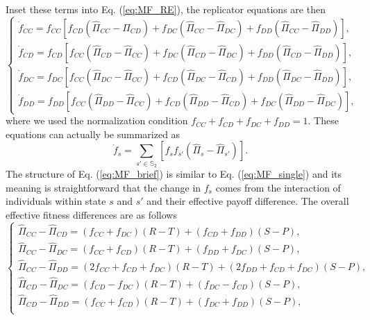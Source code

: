 \documentclass[showpacs,superscriptaddress,reprint,nofootinbib,amsmath,amssymb,aps,pre]{revtex4-1}
\begin{document}
\begin{widetext}
Inset these terms into Eq. (\ref{eq:MF_RE}), the replicator equations are then 
\begin{equation}
     \left\{
                \begin{array}{ll}
                \dot{{f}}_{CC}=f_{CC}[f_{CD}(\widehat{\Pi}_{CC}-\widehat{\Pi}_{CD}) + f_{DC}(\widehat{\Pi}_{CC}-\widehat{\Pi}_{DC}) + f_{DD}(\widehat{\Pi}_{CC}-\widehat{\Pi}_{DD})], \\ 
		\dot{{f}}_{CD}=f_{CD}[f_{CC}(\widehat{\Pi}_{CD}-\widehat{\Pi}_{CC}) + f_{DC}(\widehat{\Pi}_{CD}-\widehat{\Pi}_{DC}) + f_{DD}(\widehat{\Pi}_{CD}-\widehat{\Pi}_{DD})], \\
		\dot{{f}}_{DC}=f_{DC}[f_{CC}(\widehat{\Pi}_{DC}-\widehat{\Pi}_{CC}) + f_{CD}(\widehat{\Pi}_{DC}-\widehat{\Pi}_{CD}) + f_{DD}(\widehat{\Pi}_{DC}-\widehat{\Pi}_{DD})], \\
		\dot{{f}}_{DD}=f_{DD}[f_{CC}(\widehat{\Pi}_{DD}-\widehat{\Pi}_{CC}) + f_{CD}(\widehat{\Pi}_{DD}-\widehat{\Pi}_{CD}) + f_{DC}(\widehat{\Pi}_{DD}-\widehat{\Pi}_{DC})],
                \end{array}
        \right. \label{eq:2MF}
\end{equation}
where we used the normalization condition $f_{CC}\!+\!f_{CD}\!+\!f_{DC}\!+\!f_{DD}\!=\!1$. These equations can actually be summarized as 
\begin{equation}
\dot{{f}}_{s}=\sum_{s'\in\mathbb{S}_2}[f_{s}f_{s'}(\widehat{\Pi}_{s}-\widehat{\Pi}_{s'}) ].\label{eq:MF_brief}
\end{equation}
The structure of Eq. (\ref{eq:MF_brief}) is similar to Eq. (\ref{eq:MF_single}) and its meaning is straightforward that the change in $f_s$ comes from the interaction of individuals within state $s$ and $s'$ and their effective payoff difference. The overall effective fitness differences are as follows
\begin{equation}
     \left\{
                \begin{array}{ll}
                 \widehat{\Pi}_{CC}-\widehat{\Pi}_{CD} =  (f_{CC}+f_{DC})(R-T) + (f_{CD}+f_{DD})(S-P),\\ 
		\widehat{\Pi}_{CC}-\widehat{\Pi}_{DC} = (f_{CC}+f_{CD})(R-T) + (f_{DD}+f_{DC})(S-P),\\
		\widehat{\Pi}_{CC}-\widehat{\Pi}_{DD} = (2f_{CC}+f_{CD}+f_{DC})(R-T) + (2f_{DD}+f_{CD}+f_{DC})(S-P),\\
		\widehat{\Pi}_{CD}-\widehat{\Pi}_{DC} = (f_{CD}-f_{DC})(R-T) + (f_{DC}-f_{CD})(S-P),\\
		\widehat{\Pi}_{CD}-\widehat{\Pi}_{DD} = (f_{CC}+f_{CD})(R-T) + (f_{DC}+f_{DD})(S-P),\\

\end{array}
\end{equation}
\end{widetext}
\end{document}
